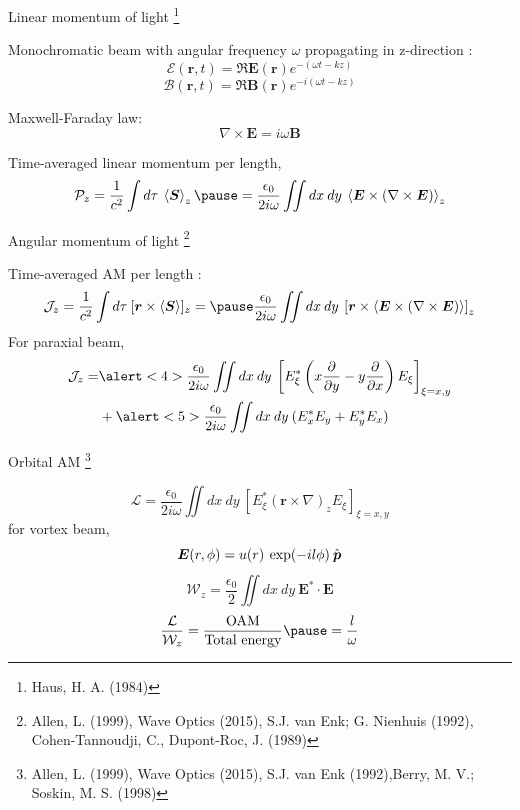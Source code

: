 \documentclass[12pt, dvipsnames]{beamer}
\numberwithin{equation}{section}
\newcommand\blfootnote[1]{%
	\begingroup
	\renewcommand\thefootnote{}\footnote{#1}%
	\addtocounter{footnote}{-1}%
	\endgroup
}
\begin{document}
\begin{frame}{Linear momentum of light}\blfootnote{Haus, H. A. (1984)}
	Monochromatic beam with angular frequency $\omega$ propagating in z-direction :
	$$\boldsymbol{\mathcal{E}}(\boldsymbol{r},t) = \Re{\boldsymbol{E}(\boldsymbol{r}) e^{-(\omega t-kz )}}$$
	$$\boldsymbol{\mathcal{B}}(\boldsymbol{r},t) = \Re{\boldsymbol{B}(\boldsymbol{r}) e^{-i (\omega t-kz ) }}$$\pause
	
	Maxwell-Faraday law:
	$$\nabla\times\boldsymbol{E}= i\omega \boldsymbol{B} $$\pause
	
	Time-averaged linear momentum per length,
	$$\mathcal{P}_z = \frac{1}{c^2}\int d\tau\: \expval{\boldsymbol{S}}_z\pause
	=\frac{\epsilon_0}{2i\omega}\iint  dx\:dy\: \expval{\boldsymbol{E}\times (\nabla\times\boldsymbol{E})}_z$$
\end{frame}

\begin{frame}{Angular momentum of light}\blfootnote{Allen, L. (1999), Wave Optics (2015), S.J. van Enk; G. Nienhuis (1992), Cohen-Tannoudji, C., Dupont-Roc, J. (1989)}
	Time-averaged AM per length :
	$$\mathcal{J}_z=\frac{1}{c^2}\int d\tau\: [\boldsymbol{r}\times\expval{\boldsymbol{S}}]_z=\pause
	\frac{\epsilon_0}{2i\omega}\iint dx\:dy\: \left[\boldsymbol{r}\times\expval{\boldsymbol{E}\times (\nabla\times\boldsymbol{E})}\right]_z$$\pause
	For paraxial beam,
	\begin{align*}
		\mathcal{J}_z
		= &\alert<4>{\frac{\epsilon_0}{2i\omega} \iint dx\:dy\:\left[E_\xi^\ast\left(x\frac{\partial}{\partial y} - y\frac{\partial}{\partial x}\right)E_\xi\right]_{\xi=x,y}}
		\\
		&+\alert<5>{\frac{\epsilon_0}{2i\omega}\iint dx\:dy\: (E_x^\ast E_y + E_y^\ast E_x)}
	\end{align*}
	
	\begin{center}
	\end{center}
\end{frame}

\begin{frame}[t]{Orbital AM}\blfootnote{Allen, L. (1999), Wave Optics (2015), S.J. van Enk (1992),Berry, M. V.; Soskin, M. S. (1998)}
	\vspace{-9pt}
	$$\mathcal{L}
	= \frac{\epsilon_0}{2i\omega} \iint dx\:dy\:\left[E_\xi^\ast\left({\boldsymbol{r}}\times\nabla\right)_zE_\xi\right]_{\xi=x,y}$$\pause
	for vortex beam,
	$$\boldsymbol{E}(r,\phi)= u(r)\:\exp(-il\phi)\:\Hat{\boldsymbol{p}}$$\pause
	$$\mathcal{W}_z=\frac{\epsilon_0}{2}\iint dx\:dy\: \boldsymbol{E}^\ast\cdot\boldsymbol{E}$$\pause
	$$\frac{\mathcal{L}}{\mathcal{W}_z}  =\frac{\text{OAM}}{\text{Total energy}}\pause= \frac{l}{\omega}$$
\end{frame}
\end{document}
